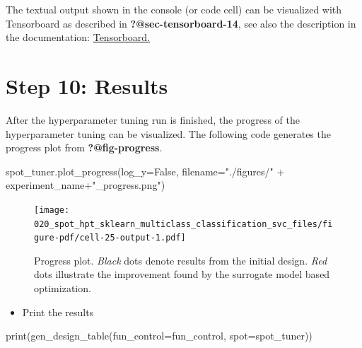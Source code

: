 \documentclass[
  letterpaper,
  DIV=11,
  numbers=noendperiod]{scrreprt}
\newenvironment{Shaded}{\begin{snugshade}}{\end{snugshade}}
\newcommand{\BuiltInTok}[1]{\textcolor[rgb]{0.00,0.23,0.31}{#1}}
\newcommand{\NormalTok}[1]{\textcolor[rgb]{0.00,0.23,0.31}{#1}}
\newcommand{\OperatorTok}[1]{\textcolor[rgb]{0.37,0.37,0.37}{#1}}
\newcommand{\StringTok}[1]{\textcolor[rgb]{0.13,0.47,0.30}{#1}}
\newcommand{\VariableTok}[1]{\textcolor[rgb]{0.07,0.07,0.07}{#1}}
\providecommand{\tightlist}{%
  \setlength{\itemsep}{0pt}\setlength{\parskip}{0pt}}\usepackage{longtable,booktabs,array}
\begin{document}
The textual output shown in the console (or code cell) can be visualized
with Tensorboard as described in \textbf{?@sec-tensorboard-14}, see also
the description in the documentation:
\href{https://sequential-parameter-optimization.github.io/spotPython/14_spot_ray_hpt_torch_cifar10.html\#sec-tensorboard-14}{Tensorboard.}

\hypertarget{sec-results-tuning-18}{%
\section{Step 10: Results}\label{sec-results-tuning-18}}

After the hyperparameter tuning run is finished, the progress of the
hyperparameter tuning can be visualized. The following code generates
the progress plot from \textbf{?@fig-progress}.

\begin{Shaded}
\begin{Highlighting}[]
\NormalTok{spot\_tuner.plot\_progress(log\_y}\OperatorTok{=}\VariableTok{False}\NormalTok{,}
\NormalTok{    filename}\OperatorTok{=}\StringTok{"./figures/"} \OperatorTok{+}\NormalTok{ experiment\_name}\OperatorTok{+}\StringTok{"\_progress.png"}\NormalTok{)}
\end{Highlighting}
\end{Shaded}

\begin{figure}[H]

{\centering \texttt{[image: 020\_spot\_hpt\_sklearn\_multiclass\_classification\_svc\_files/figure-pdf/cell-25-output-1.pdf]}

}

\caption{Progress plot. \emph{Black} dots denote results from the
initial design. \emph{Red} dots illustrate the improvement found by the
surrogate model based optimization.}

\end{figure}

\begin{itemize}
\tightlist
\item
  Print the results
\end{itemize}

\begin{Shaded}
\begin{Highlighting}[]
\BuiltInTok{print}\NormalTok{(gen\_design\_table(fun\_control}\OperatorTok{=}\NormalTok{fun\_control,}
\NormalTok{    spot}\OperatorTok{=}\NormalTok{spot\_tuner))}
\end{Highlighting}
\end{Shaded}
\end{document}
